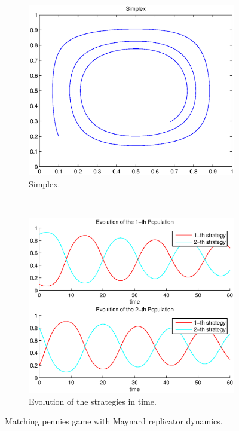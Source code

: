 \documentclass[a4paper,10pt]{article}
\begin{document}
\begin{figure}[h]
  \centering
  \begin{subfigure}[b]{0.45\textwidth}
	  \includegraphics[width=\textwidth]{./images/test2_simplex_maynard_rd.eps}
	  \caption{Simplex.}
	  \label{fig:test2_simplex_maynard_rd}
  \end{subfigure}
  ~ 
  \begin{subfigure}[b]{0.45\textwidth}
	  \includegraphics[width=\textwidth]{./images/test2_ev_maynard_rd.eps}
	  \caption{Evolution of the strategies in time.}
	  \label{fig:test2_ev_maynard_rd}
  \end{subfigure}
  \caption{Matching pennies game with Maynard replicator dynamics.}
  \label{fig:mp_game_maynard_rd}
\end{figure}
\end{document}
